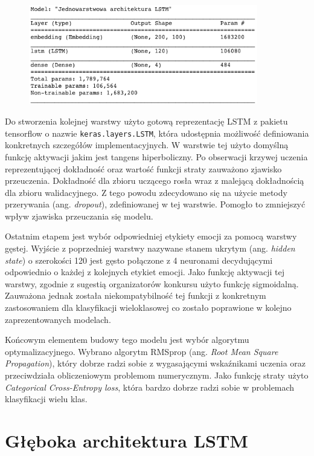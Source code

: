 \begin{figure}[t]
\centering\includegraphics[width=10cm]{figures/reports/lstm_one_table.png}
\label{rys:lstm_one_table}
\end{figure}

Do stworzenia kolejnej warstwy użyto gotową reprezentację LSTM z pakietu tensorflow o nazwie \texttt{keras.layers.LSTM}, która udostępnia możliwość definiowania konkretnych szczegółów implementacyjnych. W warstwie tej użyto domyślną funkcję aktywacji jakim jest tangens hiperboliczny. Po obserwacji krzywej uczenia reprezentującej dokładność oraz wartość funkcji straty zauważono zjawisko przeuczenia. Dokładność dla zbioru uczącego rosła wraz z malejącą dokładnością dla zbioru walidacyjnego. Z tego powodu zdecydowano się na użycie metody przerywania (ang. \textit{dropout}), zdefiniowanej w tej warstwie. Pomogło to zmniejszyć wpływ zjawiska przeuczania się modelu.

Ostatnim etapem jest wybór odpowiedniej etykiety emocji za pomocą warstwy gęstej. Wyjście z poprzedniej warstwy nazywane stanem ukrytym (ang. \textit{hidden state}) o szerokości 120 jest gęsto połączone z 4 neuronami decydującymi odpowiednio o każdej z kolejnych etykiet emocji. Jako funkcję aktywacji tej warstwy, zgodnie z sugestią organizatorów konkursu użyto funkcję sigmoidalną. Zauważona jednak została niekompatybilność tej funkcji z konkretnym zastosowaniem dla klasyfikacji wieloklasowej co zostało poprawione w kolejno zaprezentowanych modelach.  

Końcowym elementem budowy tego modelu jest wybór algorytmu optymalizacyjnego. Wybrano algorytm RMSprop \cite{ruder2016overview} (ang. \textit{Root Mean Square Propagation}), który dobrze radzi sobie z wygasającymi wskaźnikami uczenia oraz przeciwdziała obliczeniowym problemom numerycznym. Jako funkcję straty użyto \textit{Categorical Cross-Entropy loss}, która bardzo dobrze radzi sobie w problemach klasyfikacji wielu klas.

\section{Głęboka architektura LSTM}
\label{section:deep_lstm}


